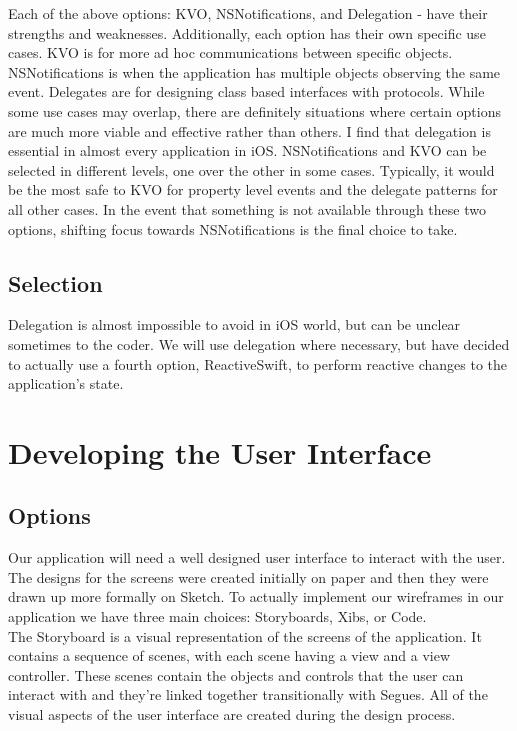 \documentclass[letterpaper,10pt,titlepage]{article}
\begin{document}
Each of the above options: KVO, NSNotifications, and Delegation - have their strengths and weaknesses. Additionally, each option has their own specific use cases. KVO is for more ad hoc communications between specific objects. NSNotifications is when the application has multiple objects observing the same event. Delegates are for designing class based interfaces with protocols. While some use cases may overlap, there are definitely situations where certain options are much more viable and effective rather than others. I find that delegation is essential in almost every application in iOS. NSNotifications and KVO can be selected in different levels, one over the other in some cases. Typically, it would be the most safe to KVO for property level events and the delegate patterns for all other cases. In the event that something is not available through these two options, shifting focus towards NSNotifications is the final choice to take.

\subsection{Selection}

Delegation is almost impossible to avoid in iOS world, but can be unclear sometimes to the coder. We will use delegation where necessary, but have decided to actually use a fourth option, ReactiveSwift, to perform reactive changes to the application's state.

\section{Developing the User Interface}

\subsection{Options}
Our application will need a well designed user interface to interact with the user. The designs for the screens were created initially on paper and then they were drawn up more formally on Sketch. To actually implement our wireframes in our application we have three main choices: Storyboards, Xibs, or Code.\\

The Storyboard is a visual representation of the screens of the application. It contains a sequence of scenes, with each scene having a view and a view controller. These scenes contain the objects and controls that the user can interact with and they're linked together transitionally with Segues. All of the visual aspects of the user interface are created during the design process.\\
\end{document}
